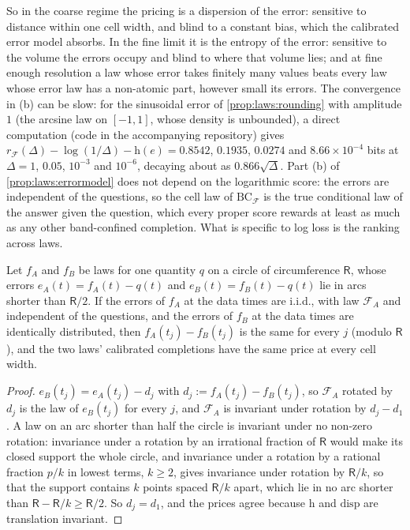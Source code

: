 So in the coarse regime the pricing is a dispersion of the error: sensitive to distance within one cell width, and blind to a constant bias, which the calibrated error model absorbs. In the fine limit it is the entropy of the error: sensitive to the volume the errors occupy and blind to where that volume lies; and at fine enough resolution a law whose error takes finitely many values beats every law whose error law has a non-atomic part, however small its errors. The convergence in (b) can be slow: for the sinusoidal error of \cref{prop:laws:rounding} with amplitude $1$ (the arcsine law on $[-1,1]$, whose density is unbounded), a direct computation (code in the accompanying repository) gives $r_{\mathcal F}(\Delta)-\log(1/\Delta)-\mathrm h(e)=0.8542$, $0.1935$, $0.0274$ and $8.66\times10^{-4}$ bits at $\Delta=1$, $0.05$, $10^{-3}$ and $10^{-6}$, decaying about as $0.866\sqrt\Delta$. Part (b) of \cref{prop:laws:errormodel} does not depend on the logarithmic score: the errors are independent of the questions, so the cell law of $\mathrm{BC}_{\mathcal F}$ is the true conditional law of the answer given the question, which every proper score rewards at least as much as any other band-confined completion. What is specific to log loss is the ranking across laws.

\begin{proposition}\label{prop:laws:rival}
Let $f_A$ and $f_B$ be laws for one quantity $q$ on a circle of circumference $\mathsf R$, whose errors $e_A(t)=f_A(t)-q(t)$ and $e_B(t)=f_B(t)-q(t)$ lie in arcs shorter than $\mathsf R/2$. If the errors of $f_A$ at the data times are i.i.d., with law $\mathcal F_A$ and independent of the questions, and the errors of $f_B$ at the data times are identically distributed, then $f_A(t_j)-f_B(t_j)$ is the same for every $j$ (modulo $\mathsf R$), and the two laws' calibrated completions have the same price at every cell width.
\end{proposition}

\begin{proof}
$e_B(t_j)=e_A(t_j)-d_j$ with $d_j:=f_A(t_j)-f_B(t_j)$, so $\mathcal F_A$ rotated by $d_j$ is the law of $e_B(t_j)$ for every $j$, and $\mathcal F_A$ is invariant under rotation by $d_j-d_1$. A law on an arc shorter than half the circle is invariant under no non-zero rotation: invariance under a rotation by an irrational fraction of $\mathsf R$ would make its closed support the whole circle, and invariance under a rotation by a rational fraction $p/k$ in lowest terms, $k\ge2$, gives invariance under rotation by $\mathsf R/k$, so that the support contains $k$ points spaced $\mathsf R/k$ apart, which lie in no arc shorter than $\mathsf R-\mathsf R/k\ge\mathsf R/2$. So $d_j=d_1$, and the prices agree because $\mathrm h$ and $\mathrm{disp}$ are translation invariant.
\end{proof}

